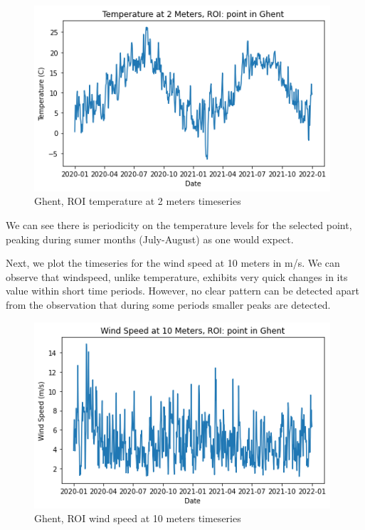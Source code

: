 \begin{figure}[h]
    \centering
    \includegraphics[width=11cm]{figures/q3_4_temperature.png}
    \caption{Ghent, ROI temperature at 2 meters timeseries}
    \label{fig:Ghent, ROI temperature at 2 meters timeseries}
\end{figure}
\FloatBarrier %

We can see there is periodicity on the temperature levels for the selected point, peaking during sumer months (July-August) as one would expect.

Next, we plot the timeseries for the wind speed at 10 meters in m/s. We can observe that windspeed, unlike temperature, exhibits very quick changes in its value within short time periods. However, no clear pattern can be detected apart from the observation that during some periods smaller peaks are detected.

\begin{figure}[h]
    \centering
    \includegraphics[width=11cm]{figures/q3_4_wind_speed.png}
    \caption{Ghent, ROI wind speed at 10 meters timeseries}
    \label{fig:Ghent, ROI wind speed at 10 meters timeseries}
\end{figure}
\FloatBarrier %

